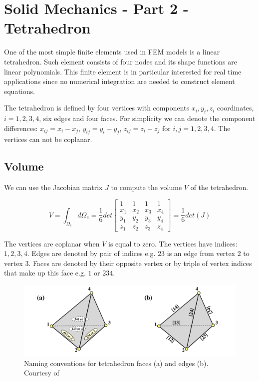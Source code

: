 \documentclass[en]{minipw} %
\begin{document}
\chapter{Solid Mechanics - Part 2 - Tetrahedron}

One of the most simple finite elements used in FEM models is a linear tetrahedron. Such element consists of four nodes and its shape functions are linear polynomials. This finite element is in particular interested for real time applications since no numerical integration are needed to construct element equations.

The tetrahedron is defined by four vertices with components $x_i, y_i, z_i$ coordinates, $i=1,2,3,4$, six edges and four faces. For simplicity we can denote the component differences: $x_{ij} = x_i - x_j$, $y_{ij} = y_i - y_j$, $z_{ij} = z_i - z_j$ for $i,j = 1,2,3,4$. The vertices can not be coplanar.

\section{Volume}

We can use the Jacobian matrix $J$ to compute the volume $V$ of the tetrahedron.

\begin{equation}
V = \int_{\Omega_{e}} d \Omega_{e} = \dfrac{1}{6} det
\begin{bmatrix}
1 & 1 & 1 & 1 \\
x_1 & x_2 & x_3 & x_4 \\
y_1 & y_2 & y_3 & y_4 \\
z_1 & z_2 & z_3 & z_4
\end{bmatrix}
= \dfrac{1}{6} det(J)
\end{equation}

The vertices are coplanar when $V$ is equal to zero. The vertices have indices: $1,2,3,4$. Edges are denoted by pair of indices e.g. $23$ is an edge from vertex $2$ to vertex $3$. Faces are denoted by their opposite vertex or by triple of vertex indices that make up this face e.g. $1$ or $234$.

\begin{figure}[h!]
\centering
\includegraphics[scale=0.5]{pictures/tetrahedron.png}
\caption[Logo MiNI]{Naming conventions for tetrahedron faces (a) and edges (b). Courtesy of~\cite{colorado_fem_lectures}}
\end{figure}
\end{document}
